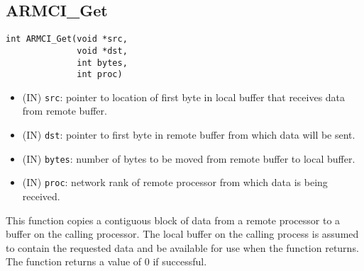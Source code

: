 \documentclass[12pt]{article}
\begin{document}
\subsection{ARMCI\_Get}
\begin{verbatim}
int ARMCI_Get(void *src,
              void *dst,
              int bytes,
              int proc)
\end{verbatim}
\begin{itemize}
\item (IN) \texttt{src}: pointer to location of first byte in local buffer
that receives data from remote buffer.
\item (IN) \texttt{dst}: pointer to first byte in remote buffer from which data
will be sent.
\item (IN) \texttt{bytes}: number of bytes to be moved from remote buffer to
local buffer.
\item (IN) \texttt{proc}: network rank of remote processor from which data is
being received.
\end{itemize}
This function copies a contiguous block of data from a remote processor to a buffer
on the calling processor. The local buffer on the calling process is assumed to
contain the requested data and be available for use when the function returns. The
function returns a value of 0 if successful.
\end{document}
